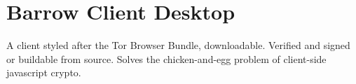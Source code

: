 \chapter{Barrow Client Desktop}
A client styled after the Tor Browser Bundle, downloadable. Verified and signed or
buildable from source. Solves the chicken-and-egg problem of client-side javascript
crypto.
